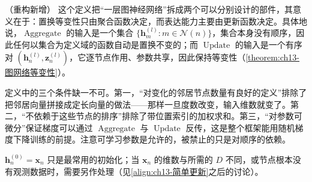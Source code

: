 \documentclass[../../main.tex]{subfiles}
\begin{document}
\begin{remark}（重构新增）
这个定义把“一层图神经网络”拆成两个可以分别设计的部件，其意义在于：置换等变性只由聚合函数决定，而表达能力主要由更新函数决定。具体地说，$\operatorname{Aggregate}$ 的输入是一个集合 $\{\bm{h}_m^{(l)}:m\in\mathcal{N}(n)\}$，集合本身没有顺序，因此任何以集合为定义域的函数自动是置换不变的；而 $\operatorname{Update}$ 的输入是一个有序对 $(\bm{h}_n^{(l)},\bm{z}_n^{(l)})$，它逐节点作用、参数共享，因此保持等变性（\cref{theorem:ch13-图网络等变性}）。\par
定义中的三个条件缺一不可。第一，“对变化的邻居节点数量有良好的定义”排除了把邻居向量拼接成定长向量的做法——那样一旦度数改变，输入维数就变了。第二，“不依赖于这些节点的排序”排除了带位置索引的加权求和。第三，“对参数可微分”保证梯度可以通过 $\operatorname{Aggregate}$ 与 $\operatorname{Update}$ 反传，这是整个框架能用随机梯度下降训练的前提。注意可学习参数是允许的，被禁止的只是对顺序的依赖。\par
$\bm{h}_n^{(0)}=\bm{x}_n$ 只是最常用的初始化；当 $\bm{x}_n$ 的维数与所需的 $D$ 不同，或节点根本没有观测数据时，需要另作处理（见\eqref{align:ch13-简单更新}之后的讨论）。
\end{remark}

\begin{center}
\end{center}
\end{document}
